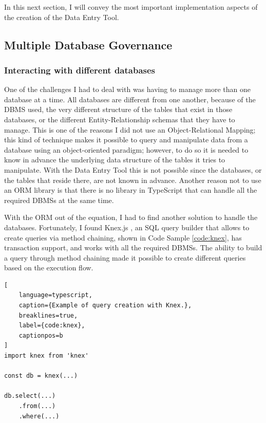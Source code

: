    
In this next section, I will convey the most important implementation aspects of the creation of the Data Entry Tool.

\subsection{Multiple Database Governance}
\subsubsection{Interacting with different databases} \label{Knex}
One of the challenges I had to deal with was having to manage more than one database at a time. All databases are different from one another, because of the DBMS used, the very different structure of the tables that exist in those databases, or the different Entity-Relationship schemas that they have to manage. This is one of the reasons I did not use an Object-Relational Mapping; this kind of technique makes it possible to query and manipulate data from a database using an object-oriented paradigm; however, to do so it is needed to know in advance the underlying data structure of the tables it tries to manipulate. With the Data Entry Tool this is not possible since the databases, or the tables that reside there, are not known in advance. Another reason not to use an ORM library is that there is no library in TypeScript that can handle all the required DBMSs at the same time.

With the ORM out of the equation, I had to find another solution to handle the databases. Fortunately, I found Knex.js \cite{knex}, an SQL query builder that allows to create queries via method chaining, shown in Code Sample \ref{code:knex}, has transaction support, and works with all the required DBMSs. The ability to build a query through method chaining made it possible to create different queries based on the execution flow.

\begin{lstlisting}[
    language=typescript,
    caption={Example of query creation with Knex.},
    breaklines=true,
    label={code:knex},
    captionpos=b
]
import knex from 'knex'

const db = knex(...)

db.select(...)
    .from(...)
    .where(...)
\end{lstlisting}

